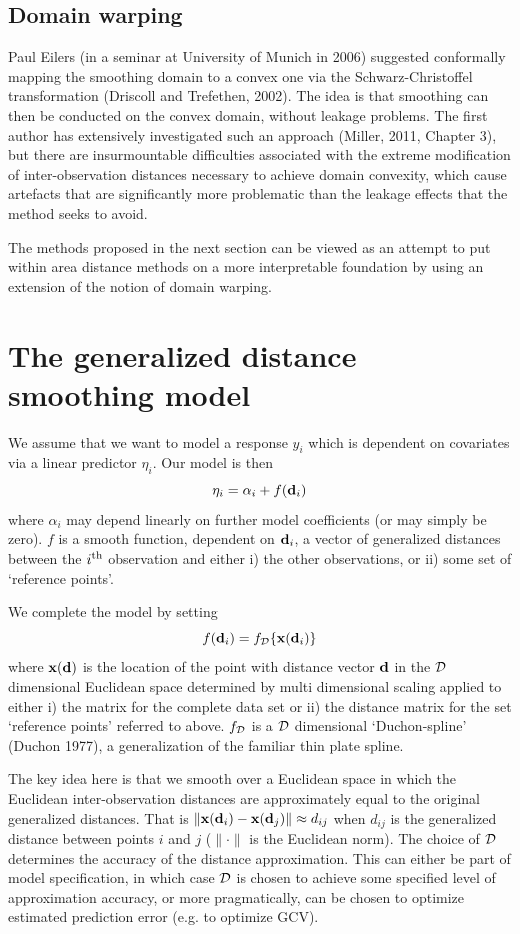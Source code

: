 \documentclass[useAMS, referee]{biom}
\begin{document}
\subsection*{Domain warping}


Paul Eilers (in a seminar at University of Munich in 2006) suggested conformally mapping the smoothing domain to a convex one  via the Schwarz-Christoffel transformation (Driscoll and Trefethen, 2002). The idea is that smoothing can then be conducted on the convex domain, without leakage problems. The first author has extensively investigated such an approach (Miller, 2011, Chapter 3), but there are insurmountable difficulties associated with the extreme modification of inter-observation distances necessary to achieve domain convexity, which cause artefacts that are significantly more problematic than the leakage effects that the method seeks to avoid. 

The methods proposed in the next section can be viewed as an attempt to put within area distance methods on a more interpretable foundation by using an extension of the notion of domain warping. 


\section{The generalized distance smoothing model}
\label{proposed-model}

We assume that we want to model a response $y_i$ which is dependent on covariates via a linear predictor $\eta_i$. Our model is then
$$
\eta_i = \alpha_i + f({\bf d}_i)
$$
where $\alpha_i$ may depend linearly on further model coefficients (or may simply be zero). $f$ is a smooth function, dependent on ${\bf d}_i$, a vector of generalized distances between the $i^{\rm th}$ observation and either i) the other observations, or ii) some set of `reference points'. 

We complete the model by setting 
$$
f({\bf d}_i) = f_{\cal D}\{{\bf x}({\bf d}_i)\}
$$
where ${\bf x}({\bf d})$ is the location of the point with distance vector $\bf d$ in the $\cal D$ dimensional 
Euclidean space determined by multi dimensional scaling applied to either i) the matrix for the complete data set or ii) the distance matrix for the set `reference points' referred to above. $f_{\cal D}$ is a $\cal D$ dimensional `Duchon-spline' (Duchon 1977), a generalization of the familiar thin plate spline. 

The key idea here is that we smooth over a Euclidean space  in which the Euclidean inter-observation distances are approximately equal to the original generalized distances. That is  $\|{\bf x}({\bf d}_i) - {\bf x}({\bf d}_j) \| \approx d_{ij}$ when $d_{ij}$ is the generalized distance between points $i$ and $j$ ($\|\cdot \|$ is the Euclidean norm). The choice of $\cal D$ determines the accuracy of the distance approximation. This can either be part of model specification, in which case $\cal D$ is chosen to achieve some specified level of approximation accuracy, or more pragmatically, can be chosen to optimize estimated prediction error (e.g. to optimize GCV).
\end{document}
